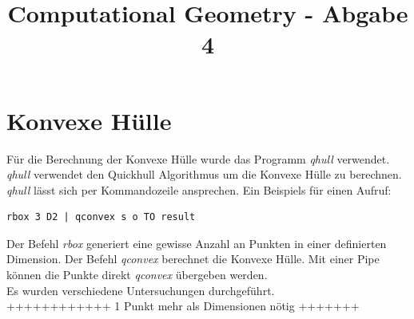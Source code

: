 \documentclass[conference]{IEEEtran}
\begin{document}
	
	\title{Computational Geometry - Abgabe 4}
	
	\author{
	}
	
	\maketitle
	
	

	\section{Konvexe Hülle}
	Für die Berechnung der Konvexe Hülle wurde das Programm \textit{qhull} \cite{b2} verwendet. \textit{qhull} verwendet den Quickhull Algorithmus um die Konvexe Hülle zu berechnen. \textit{qhull} lässt sich per Kommandozeile ansprechen. Ein Beispiels für einen Aufruf:
	\begin{lstlisting}[basicstyle=\tiny]
	rbox 3 D2 | qconvex s o TO result
	\end{lstlisting}
	Der Befehl \textit{rbox} generiert eine gewisse Anzahl an Punkten in einer definierten Dimension. Der Befehl \textit{qconvex} berechnet die Konvexe Hülle. Mit einer Pipe können die Punkte direkt \textit{qconvex} übergeben werden.\\
	Es wurden verschiedene Untersuchungen durchgeführt.\\
	
	
	++++++++++++
	1 Punkt mehr als Dimensionen nötig
	+++++++
\end{document}
